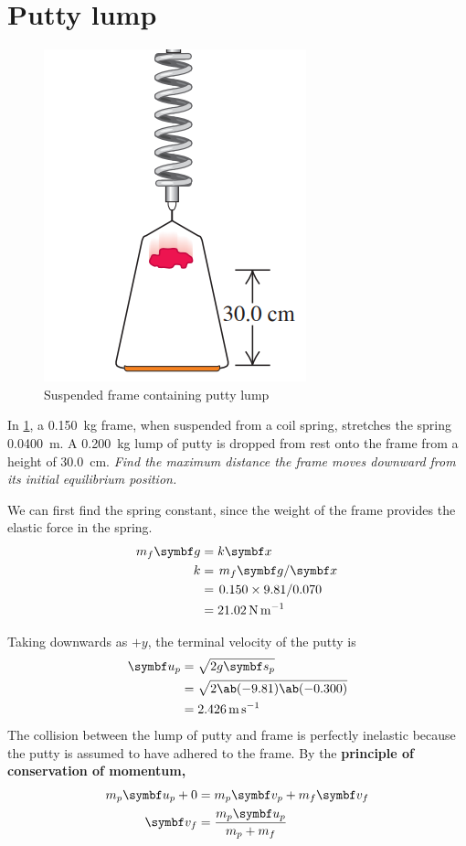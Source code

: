 \section{Putty lump}
\begin{figure}
  \centering
  \includegraphics[scale=0.5]{assets/puttylump.png}
  \caption{Suspended frame containing putty lump}
  \label{fig:puttylump}
\end{figure}
In \cref{fig:puttylump}, a \qty{0.150}{\kg} frame, when suspended from a coil
spring, stretches the spring \qty{0.0400}{\metre}. A \qty{0.200}{\kg} lump of
putty is dropped from rest onto the frame from a height of \qty{30.0}{\cm}.
\it{Find the maximum distance the frame moves downward from its
initial equilibrium position.}

We can first find the spring constant, since the weight of the frame
provides the elastic force in the spring.
\begin{align*}
  m_f\mv{g} &= k\mv{x} \\
  k &= \lf{m_f\mv{g}}{\mv{x}} \\
  &= \lf{0.150\times 9.81}{0.070} \\
  &= \qty{21.02}{\newton\per\metre}
\end{align*}

Taking downwards as \(+y\), the terminal velocity of the putty is
\begin{align*}
  \mv{u}_p &= \sqrt{2g\mv{s}_p} \\
  &= \sqrt{2\ab(-9.81)\ab(-0.300)} \\
  &= \qty{2.426}{\metre\per\second}
\end{align*}
The collision between the lump of putty and frame is perfectly
inelastic because the putty is assumed to
have adhered to the frame. By the \bf{principle of conservation of momentum},
\begin{align*}
  m_p\mv{u}_p + 0 &= m_p\mv{v}_p + m_f\mv{v}_f \\
  \mv{v}_f &= \f{m_p\mv{u}_p}{m_p + m_f}
\end{align*}

